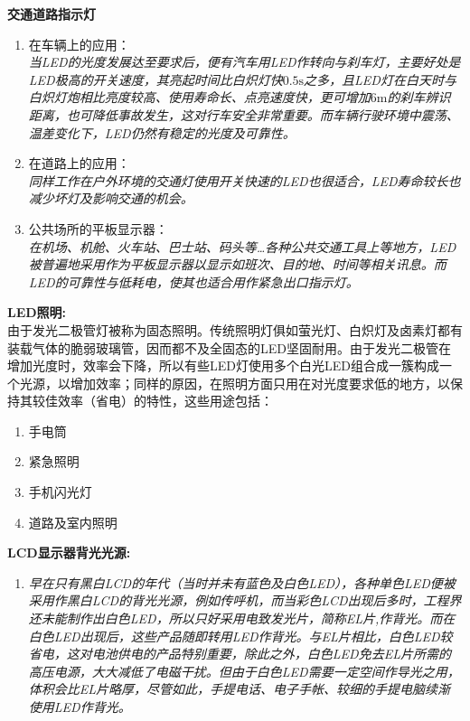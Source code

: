 \begin{slide}
\textbf{交通道路指示灯}
\begin{enumerate}[1.]
    \item 在车辆上的应用：\\
    \textit{当LED的光度发展达至要求后，便有汽车用LED作转向与刹车灯，主要好处是LED极高的开关速度，其亮起时间比白炽灯快$\mathrm{0.5s}$之多，且LED灯在白天时与白炽灯炮相比亮度较高、使用寿命长、点亮速度快，更可增加$\mathrm{6m}$的刹车辨识距离，也可降低事故发生，这对行车安全非常重要。而车辆行驶环境中震荡、温差变化下，LED仍然有稳定的光度及可靠性。}
    \item 在道路上的应用：\\
    \textit{同样工作在户外环境的交通灯使用开关快速的LED也很适合，LED寿命较长也减少坏灯及影响交通的机会。}
    \item 公共场所的平板显示器：\\
    \textit{在机场、机舱、火车站、巴士站、码头等…各种公共交通工具上等地方，LED被普遍地采用作为平板显示器以显示如班次、目的地、时间等相关讯息。而LED的可靠性与低耗电，使其也适合用作紧急出口指示灯。}
\end{enumerate}
\end{slide}

\begin{slide}
\textbf{LED照明:}\\
由于发光二极管灯被称为固态照明。传统照明灯俱如萤光灯、白炽灯及卤素灯都有装载气体的脆弱玻璃管，因而都不及全固态的LED坚固耐用。由于发光二极管在增加光度时，效率会下降，所以有些LED灯使用多个白光LED组合成一簇构成一个光源，以增加效率；同样的原因，在照明方面只用在对光度要求低的地方，以保持其较佳效率（省电）的特性，这些用途包括：
\begin{enumerate} [1.]
    \item 手电筒
    \item 紧急照明
    \item 手机闪光灯
    \item 道路及室内照明
\end{enumerate}
\end{slide}

\begin{slide}
\textbf{LCD显示器背光光源:}
\begin{enumerate}[]
    \item
    \textit{早在只有黑白LCD的年代（当时并未有蓝色及白色LED），各种单色LED便被采用作黑白LCD的背光光源，例如传呼机，而当彩色LCD出现后多时，工程界还未能制作出白色LED，所以只好采用电致发光片，简称EL片,作背光。而在白色LED出现后，这些产品随即转用LED作背光。与EL片相比，白色LED较省电，这对电池供电的产品特别重要，除此之外，白色LED免去EL片所需的高压电源，大大减低了电磁干扰。但由于白色LED需要一定空间作导光之用，体积会比EL片略厚，尽管如此，手提电话、电子手帐、较细的手提电脑续渐使用LED作背光。}
\end{enumerate}
\end{slide}

